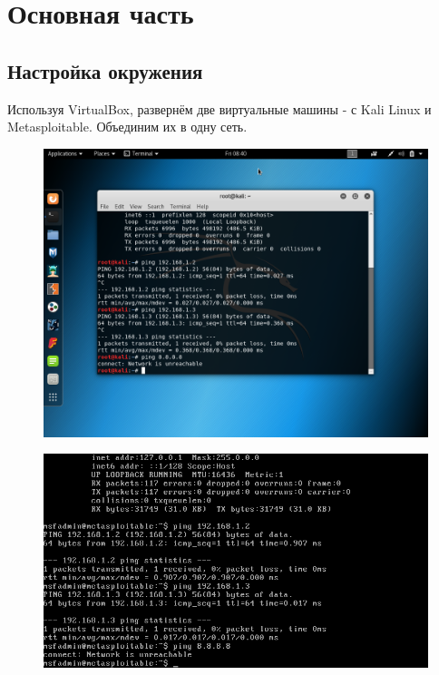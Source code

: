 \chapter{Основная часть}


\section{Настройка окружения}

Используя VirtualBox, развернём две виртуальные машины - с Kali Linux и Metasploitable.
Объединим их в одну сеть.

\begin{figure}[H]
	\includegraphics[width=\textwidth]{images/kali_ping.png}
\end{figure}

\begin{figure}[H]
	\includegraphics[width=\textwidth]{images/meta_ping.png}
\end{figure}

